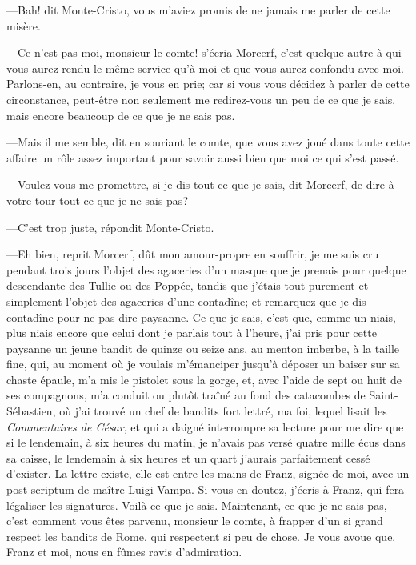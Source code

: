 —Bah! dit Monte-Cristo, vous m'aviez promis de ne jamais me parler de cette misère. 

—Ce n'est pas moi, monsieur le comte! s'écria Morcerf, c'est quelque autre à qui vous aurez rendu le même service qu'à moi et que vous aurez confondu avec moi. Parlons-en, au contraire, je vous en prie; car si vous vous décidez à parler de cette circonstance, peut-être non seulement me redirez-vous un peu de ce que je sais, mais encore beaucoup de ce que je ne sais pas. 

—Mais il me semble, dit en souriant le comte, que vous avez joué dans toute cette affaire un rôle assez important pour savoir aussi bien que moi ce qui s'est passé. 

—Voulez-vous me promettre, si je dis tout ce que je sais, dit Morcerf, de dire à votre tour tout ce que je ne sais pas? 

—C'est trop juste, répondit Monte-Cristo. 

—Eh bien, reprit Morcerf, dût mon amour-propre en souffrir, je me suis cru pendant trois jours l'objet des agaceries d'un masque que je prenais pour quelque descendante des Tullie ou des Poppée, tandis que j'étais tout purement et simplement l'objet des agaceries d'une contadîne; et remarquez que je dis contadîne pour ne pas dire paysanne. Ce que je sais, c'est que, comme un niais, plus niais encore que celui dont je parlais tout à l'heure, j'ai pris pour cette paysanne un jeune bandit de quinze ou seize ans, au menton imberbe, à la taille fine, qui, au moment où je voulais m'émanciper jusqu'à déposer un baiser sur sa chaste épaule, m'a mis le pistolet sous la gorge, et, avec l'aide de sept ou huit de ses compagnons, m'a conduit ou plutôt traîné au fond des catacombes de Saint-Sébastien, où j'ai trouvé un chef de bandits fort lettré, ma foi, lequel lisait les \textit{Commentaires de César}, et qui a daigné interrompre sa lecture pour me dire que si le lendemain, à six heures du matin, je n'avais pas versé quatre mille écus dans sa caisse, le lendemain à six heures et un quart j'aurais parfaitement cessé d'exister. La lettre existe, elle est entre les mains de Franz, signée de moi, avec un post-scriptum de maître Luigi Vampa. Si vous en doutez, j'écris à Franz, qui fera légaliser les signatures. Voilà ce que je sais. Maintenant, ce que je ne sais pas, c'est comment vous êtes parvenu, monsieur le comte, à frapper d'un si grand respect les bandits de Rome, qui respectent si peu de chose. Je vous avoue que, Franz et moi, nous en fûmes ravis d'admiration. 

